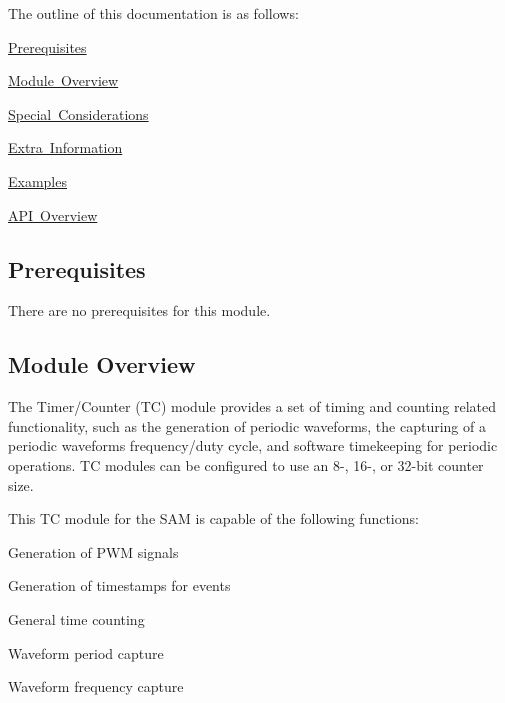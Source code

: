 The outline of this documentation is as follows\+:
\begin{DoxyItemize}
\item \mbox{\hyperlink{group__asfdoc__sam0__tc__group_asfdoc_sam0_tc_prerequisites}{Prerequisites}}
\item \mbox{\hyperlink{group__asfdoc__sam0__tc__group_asfdoc_sam0_tc_module_overview}{Module Overview}}
\item \mbox{\hyperlink{group__asfdoc__sam0__tc__group_asfdoc_sam0_tc_special_considerations}{Special Considerations}}
\item \mbox{\hyperlink{group__asfdoc__sam0__tc__group_asfdoc_sam0_tc_extra_info}{Extra Information}}
\item \mbox{\hyperlink{group__asfdoc__sam0__tc__group_asfdoc_sam0_tc_examples}{Examples}}
\item \mbox{\hyperlink{group__asfdoc__sam0__tc__group_asfdoc_sam0_tc_api_overview}{A\+PI Overview}}
\end{DoxyItemize}\hypertarget{group__asfdoc__sam0__tc__group_asfdoc_sam0_tc_prerequisites}{}\subsection{Prerequisites}\label{group__asfdoc__sam0__tc__group_asfdoc_sam0_tc_prerequisites}
There are no prerequisites for this module.\hypertarget{group__asfdoc__sam0__tc__group_asfdoc_sam0_tc_module_overview}{}\subsection{Module Overview}\label{group__asfdoc__sam0__tc__group_asfdoc_sam0_tc_module_overview}
The Timer/\+Counter (TC) module provides a set of timing and counting related functionality, such as the generation of periodic waveforms, the capturing of a periodic waveform\textquotesingle{}s frequency/duty cycle, and software timekeeping for periodic operations. TC modules can be configured to use an 8-\/, 16-\/, or 32-\/bit counter size.

This TC module for the S\+AM is capable of the following functions\+:


\begin{DoxyItemize}
\item Generation of P\+WM signals
\item Generation of timestamps for events
\item General time counting
\item Waveform period capture
\item Waveform frequency capture
\end{DoxyItemize}

